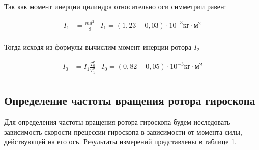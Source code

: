 \documentclass[a4paper,12pt]{article} %
\begin{document}
Так как момент инерции цилиндра относительно оси симметрии равен:

\begin{align*}
  I_1 &= \frac{md^2}{8} & I_1 = (1,23 \pm 0,03) \cdot 10^{-3} кг \cdot м^2 \\
\end{align*}

Тогда исходя из формулы вычислим момент инерции ротора $I_2$

\begin{align*}
  I_0 &= I_1 \frac{T_0^2}{T_1^2} & I_0 = (0,82 \pm 0,05) \cdot 10^{-3} кг \cdot м^2 \\
\end{align*}

\subsection{Определение частоты вращения ротора гироскопа}

Для определения частоты вращения ротора гироскопа будем исследовать зависимость скорости прецессии гироскопа в зависимости от момента силы, действующей на его ось. Результаты измерений представлены в таблице 1.
\end{document}

